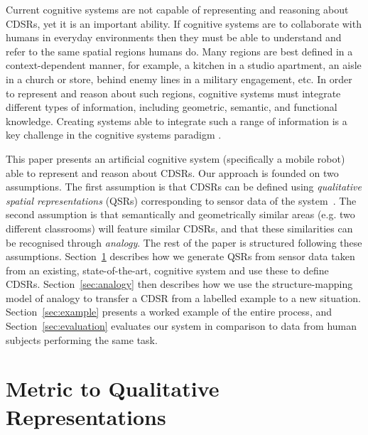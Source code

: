\documentclass[letterpaper]{article}
\begin{document}
Current cognitive systems are not capable of representing and reasoning about CDSRs, yet it is an important ability. If cognitive systems are to collaborate with humans in everyday environments then they must be able to understand and refer to the same spatial regions humans do. Many regions are best defined in a context-dependent manner, for example, a kitchen in a studio apartment, an aisle in a church or store, behind enemy lines in a military engagement, etc. In order to represent and reason about such regions, cognitive systems must integrate different types of information, including geometric, semantic, and functional knowledge. Creating systems able to integrate such a range of information is a key challenge in the cognitive systems paradigm \cite{langley:inpress}.

This paper presents an artificial cognitive system (specifically a mobile robot) able to represent and reason about CDSRs. Our approach is founded on two assumptions. The first assumption is that CDSRs can be defined using \emph{qualitative spatial representations} (QSRs) corresponding to sensor data of the system~\cite{Cohn:2001}. The second assumption is that semantically and geometrically similar areas (e.g. two different classrooms) will feature similar CDSRs, and that these similarities can be recognised through \emph{analogy}. The rest of the paper is structured following these assumptions. Section~\ref{sec:qsr-gen} describes how we generate QSRs from sensor data taken from an existing, state-of-the-art, cognitive system and use these to define CDSRs. Section~\ref{sec:analogy} then describes how we use the structure-mapping model of analogy \cite{Gentner1983a} to transfer a CDSR from a labelled example to a new situation. Section~\ref{sec:example} presents a worked example of the entire process, and Section~\ref{sec:evaluation} evaluates our system in comparison to data from human subjects performing the same task.


\section{Metric to Qualitative Representations}\label{sec:qsr-gen}

\end{document}
